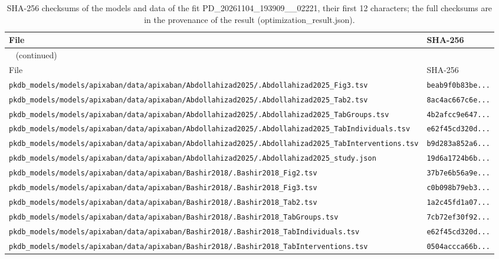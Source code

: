 \begin{longtable}{ll}
\caption{SHA-256 checksums of the models and data of the fit PD\_20261104\_193909\_\_02221, their first 12 characters; the full checksums are in the provenance of the result (optimization\_result.json).}\label{tab:checksums:PD_20261104_193909__02221} \\
\toprule
File & SHA-256 \\
\midrule
\endfirsthead
\multicolumn{2}{l}{\small\tablename~\thetable{} (continued)} \\
\toprule
File & SHA-256 \\
\midrule
\endhead
\bottomrule
\endlastfoot
\texttt{pkdb\_models/models/apixaban/data/apixaban/Abdollahizad2025/.Abdollahizad2025\_Fig3.tsv} & \texttt{beab9f0b83be...} \\
\texttt{pkdb\_models/models/apixaban/data/apixaban/Abdollahizad2025/.Abdollahizad2025\_Tab2.tsv} & \texttt{8ac4ac667c6e...} \\
\texttt{pkdb\_models/models/apixaban/data/apixaban/Abdollahizad2025/.Abdollahizad2025\_TabGroups.tsv} & \texttt{4b2afcc9e647...} \\
\texttt{pkdb\_models/models/apixaban/data/apixaban/Abdollahizad2025/.Abdollahizad2025\_TabIndividuals.tsv} & \texttt{e62f45cd320d...} \\
\texttt{pkdb\_models/models/apixaban/data/apixaban/Abdollahizad2025/.Abdollahizad2025\_TabInterventions.tsv} & \texttt{b9d283a852a6...} \\
\texttt{pkdb\_models/models/apixaban/data/apixaban/Abdollahizad2025/.Abdollahizad2025\_study.json} & \texttt{19d6a1724b6b...} \\
\texttt{pkdb\_models/models/apixaban/data/apixaban/Bashir2018/.Bashir2018\_Fig2.tsv} & \texttt{37b7e6b56a9e...} \\
\texttt{pkdb\_models/models/apixaban/data/apixaban/Bashir2018/.Bashir2018\_Fig3.tsv} & \texttt{c0b098b79eb3...} \\
\texttt{pkdb\_models/models/apixaban/data/apixaban/Bashir2018/.Bashir2018\_Tab2.tsv} & \texttt{1a2c45fd1a07...} \\
\texttt{pkdb\_models/models/apixaban/data/apixaban/Bashir2018/.Bashir2018\_TabGroups.tsv} & \texttt{7cb72ef30f92...} \\
\texttt{pkdb\_models/models/apixaban/data/apixaban/Bashir2018/.Bashir2018\_TabIndividuals.tsv} & \texttt{e62f45cd320d...} \\
\texttt{pkdb\_models/models/apixaban/data/apixaban/Bashir2018/.Bashir2018\_TabInterventions.tsv} & \texttt{0504accca66b...} \\

\end{longtable}
